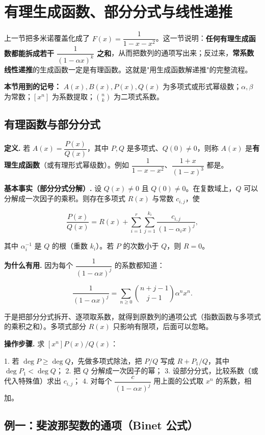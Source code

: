 \section{有理生成函数、部分分式与线性递推}


上一节把多米诺覆盖化成了 $F(x)=\dfrac{1}{1-x-x^2}$。这一节说明：\textbf{任何有理生成函数都能拆成若干 $\dfrac{1}{(1-\alpha x)^k}$ 之和}，从而把数列的通项写出来；反过来，\textbf{常系数线性递推}的生成函数一定是有理函数。这就是"用生成函数解递推"的完整流程。

\textbf{本节用到的记号：} $A(x),B(x),P(x),Q(x)$ 为多项式或形式幂级数；$\alpha,\beta$ 为常数；$[x^n]$ 为系数提取；$\binom nk$ 为二项式系数。

\subsection{有理函数与部分分式}


\textbf{定义.} 若 $A(x)=\dfrac{P(x)}{Q(x)}$，其中 $P,Q$ 是多项式、$Q(0)\neq0$，则称 $A(x)$ 是\textbf{有理生成函数}（或有理形式幂级数）。例如 $\dfrac{1}{1-x-x^2}$、$\dfrac{1+x}{(1-x)^3}$ 都是。

\textbf{基本事实（部分分式分解）.} 设 $Q(x)\neq0$ 且 $Q(0)\neq0$。在复数域上，$Q$ 可以分解成一次因子的乘积。则存在多项式 $R(x)$ 与常数 $c_{i,j}$，使

\[
\frac{P(x)}{Q(x)}=R(x)+\sum_{i=1}^{r}\sum_{j=1}^{k_i}\frac{c_{i,j}}{(1-\alpha_i x)^j},
\]

其中 $\alpha_i^{-1}$ 是 $Q$ 的根（重数 $k_i$）。若 $P$ 的次数小于 $Q$，则 $R=0$。

\textbf{为什么有用.} 因为每个 $\dfrac{1}{(1-\alpha x)^j}$ 的系数都知道：

\[
\frac{1}{(1-\alpha x)^j}=\sum_{n\ge0}\binom{n+j-1}{j-1}\alpha^n x^n.
\]

于是把部分分式拆开、逐项取系数，就得到原数列的通项公式（指数函数与多项式的乘积之和）。多项式部分 $R(x)$ 只影响有限项，后面可以忽略。

\textbf{操作步骤.} 求 $[x^n]P(x)/Q(x)$：

1. 若 $\deg P\ge\deg Q$，先做多项式除法，把 $P/Q$ 写成 $R+P_1/Q$，其中 $\deg P_1<\deg Q$；
2. 把 $Q$ 分解成一次因子的幂；
3. 设部分分式，比较系数（或代入特殊值）求出 $c_{i,j}$；
4. 对每个 $\dfrac{c}{(1-\alpha x)^j}$ 用上面的公式取 $x^n$ 的系数，相加。

\subsection{例一：斐波那契数的通项（Binet 公式）}


